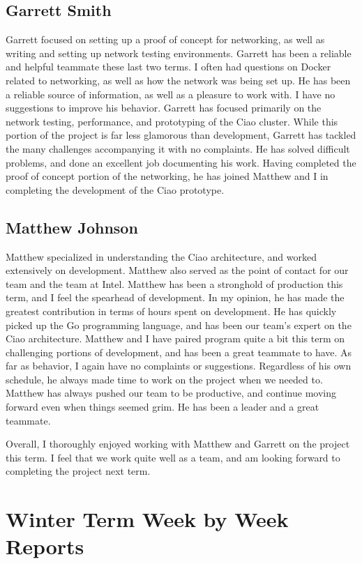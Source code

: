 \documentclass[10pt,onecolumn,journal,draftclsnofoot]{IEEEtran}
\begin{document}
\subsection{Garrett Smith}
Garrett focused on setting up a proof of concept for networking, as well as
writing and setting up network testing environments. Garrett has been a reliable
and helpful teammate these last two terms. I often had questions on Docker related
to networking, as well as how the network was being set up. He has been a reliable
source of information, as well as a pleasure to work with.
I have no suggestions to improve his behavior. Garrett has focused primarily
on the network testing, performance, and prototyping of the Ciao cluster.
While this portion of the project is far less glamorous than development,
Garrett has tackled the many challenges accompanying it with no complaints. He
has solved difficult problems, and done an excellent job documenting his work.
Having completed the proof of concept portion of the networking, he has joined
Matthew and I in completing the development of the Ciao prototype.

\subsection{Matthew Johnson}
Matthew specialized in understanding the Ciao architecture, and worked extensively
on development. Matthew also served as the point of contact for our team and
the team at Intel. Matthew has been a stronghold of production this term, and
I feel the spearhead of development. In my opinion, he has made the greatest
contribution in terms of hours spent on development. He has quickly picked up
the Go programming language, and has been our team's expert on the Ciao
architecture. Matthew and I have paired program quite a bit this term on 
challenging portions of development, and has been a great teammate to have.
As far as behavior, I again have no complaints or suggestions. Regardless of his
own schedule, he always made time to work on the project when we needed to. 
Matthew has always pushed our team to be productive, and continue moving forward
even when things seemed grim. He has been a leader and a great teammate. 

Overall, I thoroughly enjoyed working with Matthew and Garrett on the project
this term. I feel that we work quite well as a team, and am looking forward
to completing the project next term.

\section{Winter Term Week by Week Reports}
\end{document}
